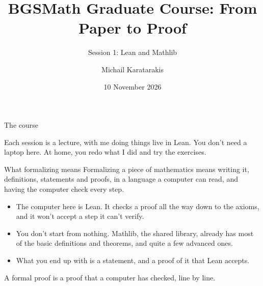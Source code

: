 \documentclass[10pt, aspectratio=169]{beamer}
\title{BGSMath Graduate Course: From Paper to Proof}
\subtitle{Session 1: Lean and Mathlib}
\author{Michail Karatarakis}
\institute{Radboud University Nijmegen \& Axiomatic AI}
\date{10 November 2026}
\begin{document}
\maketitle

\begin{frame}[fragile]{The course}

\vspace{0.4em}
Each session is a lecture, with me doing things live in Lean. You don't need a laptop here. At home, you redo what I did and try the exercises.
\end{frame}

\begin{frame}[fragile]{What formalizing means}
Formalizing a piece of mathematics means writing it, definitions, statements and proofs, in a language a computer can read, and having the computer check every step.

\vspace{0.6em}
\begin{itemize}
\item The computer here is Lean. It checks a proof all the way down to the axioms, and it won't accept a step it can't verify.
\item You don't start from nothing. Mathlib, the shared library, already has most of the basic definitions and theorems, and quite a few advanced ones.
\item What you end up with is a statement, and a proof of it that Lean accepts.
\end{itemize}

\vspace{0.8em}
\begin{keypoint}
\normalsize A formal proof is a proof that a computer has checked, line by line.
\end{keypoint}
\end{frame}
\end{document}
